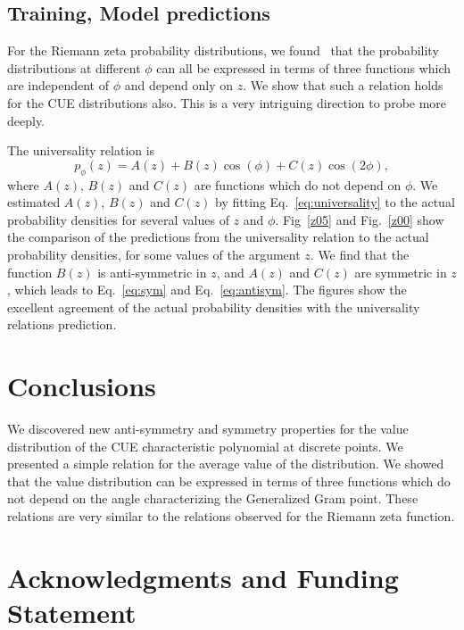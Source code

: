 \documentclass[twoside]{article}
\begin{document}
\subsection{\label{relation}Training,  Model predictions}

For the Riemann zeta probability distributions, we found~\cite{Shanker 2020}
that the probability distributions at different $\phi$ can all be expressed in
terms of three functions which are independent of $\phi$ and depend only on $z$.
We show that such a relation holds for the CUE distributions also.
This is a very intriguing direction to probe more deeply.

The universality relation is
\begin{equation}
p_{\phi}(z) = A(z) + B(z)\cos(\phi) +C(z)\cos(2\phi),
\label{eq:universality}
\end{equation}
where $A(z)$, $B(z)$ and $C(z)$ are  functions which do not depend on $\phi$. 
We estimated $A(z)$, $B(z)$ and $C(z)$ by fitting Eq.~\ref{eq:universality} to the actual
probability densities for several values of $z$ and $\phi$. 
Fig~\ref{z05} and Fig.~\ref{z00} show the comparison of the predictions 
from the universality 
relation to the actual probability densities, for some values of the argument $z$.
We find that the function 
$B(z)$ is anti-symmetric in $z$, and $A(z)$ and $C(z)$ are symmetric in $z$, which 
leads to Eq.~\ref{eq:sym} and Eq.~\ref{eq:antisym}.
The figures show the excellent agreement of the actual probability densities with the
universality relations prediction.


\section{\label{conclusions}Conclusions}

We discovered new anti-symmetry and symmetry properties 
for the value distribution of the CUE characteristic polynomial at discrete points. 
We presented a simple relation for the average value 
of the  distribution. We showed that the value distribution 
can be expressed in terms of three  functions 
 which do not depend on the angle characterizing the Generalized Gram point. 
These relations are very similar to the relations observed for 
the Riemann zeta function.

\section*{Acknowledgments and Funding Statement}
\end{document}
